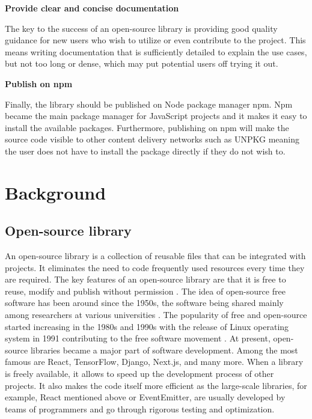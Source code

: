 \documentclass{l4proj}
\begin{document}
\textbf{Provide clear and concise documentation}\par
The key to the success of an open-source library is providing good quality guidance for new users who wish to utilize or even contribute to the project. This means writing documentation that is sufficiently detailed to explain the use cases, but not too long or dense, which may put potential users off trying it out. 

\textbf{Publish on npm}\par
Finally, the library should be published on Node package manager npm. Npm became the main package manager for JavaScript projects and it makes it easy to install the available packages. Furthermore, publishing on npm will make the source code visible to other content delivery networks such as UNPKG meaning the user does not have to install the package directly if they do not wish to.





\chapter{Background}

\section{Open-source library}
An open-source library is a collection of reusable files that can be integrated with projects. It eliminates the need to code frequently used resources every time they are required. The key features of an open-source library are that it is free to reuse, modify and publish without permission \cite{HeavyAI}. The idea of open-source free software has been around since the 1950s, the software being shared mainly among researchers at various universities \cite{spice}. The popularity of free and open-source started increasing in the 1980s and 1990s with the release of Linux operating system in 1991 contributing to the free software movement \cite{mob}. At present, open-source libraries became a major part of software development. Among the most famous are React, TensorFlow, Django, Next.js, and many more. When a library is freely available, it allows to speed up the development process of other projects. It also makes the code itself more efficient as the large-scale libraries, for example, React mentioned above or EventEmitter, are usually developed by teams of programmers and go through rigorous testing and optimization. 
\end{document}

